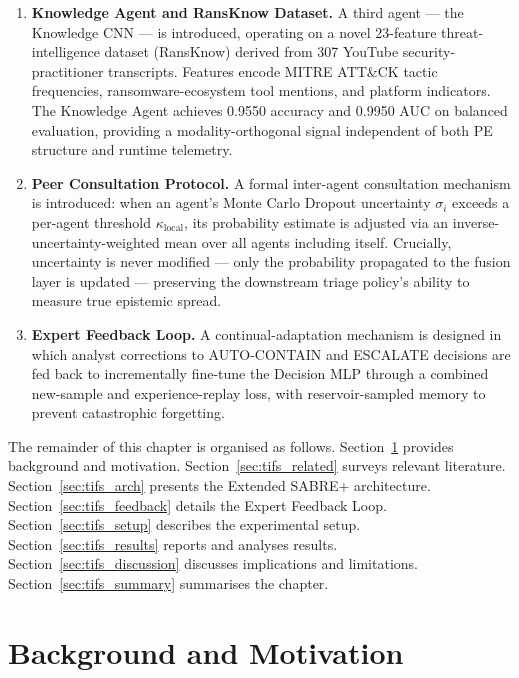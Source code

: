 \begin{enumerate}
    \item \textbf{Knowledge Agent and RansKnow Dataset.} A third agent — the Knowledge CNN — is introduced, operating on a novel 23-feature threat-intelligence dataset (RansKnow) derived from 307 YouTube security-practitioner transcripts. Features encode MITRE ATT\&CK tactic frequencies, ransomware-ecosystem tool mentions, and platform indicators. The Knowledge Agent achieves 0.9550 accuracy and 0.9950 AUC on balanced evaluation, providing a modality-orthogonal signal independent of both PE structure and runtime telemetry.

    \item \textbf{Peer Consultation Protocol.} A formal inter-agent consultation mechanism is introduced: when an agent's Monte Carlo Dropout uncertainty $\sigma_i$ exceeds a per-agent threshold $\kappa_\text{local}$, its probability estimate is adjusted via an inverse-uncertainty-weighted mean over all agents including itself. Crucially, uncertainty is never modified — only the probability propagated to the fusion layer is updated — preserving the downstream triage policy's ability to measure true epistemic spread.

    \item \textbf{Expert Feedback Loop.} A continual-adaptation mechanism is designed in which analyst corrections to AUTO-CONTAIN and ESCALATE decisions are fed back to incrementally fine-tune the Decision MLP through a combined new-sample and experience-replay loss, with reservoir-sampled memory to prevent catastrophic forgetting.
\end{enumerate}

The remainder of this chapter is organised as follows. Section~\ref{sec:tifs_background} provides background and motivation. Section~\ref{sec:tifs_related} surveys relevant literature. Section~\ref{sec:tifs_arch} presents the Extended SABRE+ architecture. Section~\ref{sec:tifs_feedback} details the Expert Feedback Loop. Section~\ref{sec:tifs_setup} describes the experimental setup. Section~\ref{sec:tifs_results} reports and analyses results. Section~\ref{sec:tifs_discussion} discusses implications and limitations. Section~\ref{sec:tifs_summary} summarises the chapter.


\section{Background and Motivation}
\label{sec:tifs_background}

